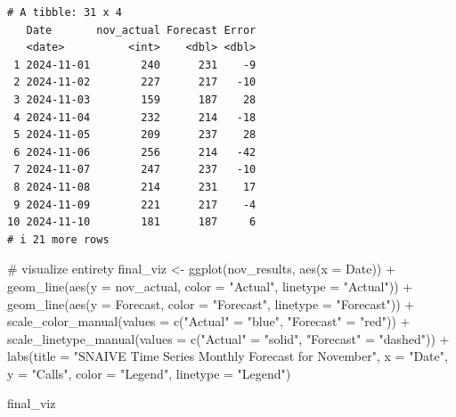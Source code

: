 \documentclass[
  letterpaper,
  DIV=11,
  numbers=noendperiod]{scrartcl}
\newenvironment{Shaded}{\begin{snugshade}}{\end{snugshade}}
\newcommand{\AttributeTok}[1]{\textcolor[rgb]{0.40,0.45,0.13}{#1}}
\newcommand{\CommentTok}[1]{\textcolor[rgb]{0.37,0.37,0.37}{#1}}
\newcommand{\FunctionTok}[1]{\textcolor[rgb]{0.28,0.35,0.67}{#1}}
\newcommand{\NormalTok}[1]{\textcolor[rgb]{0.00,0.23,0.31}{#1}}
\newcommand{\OtherTok}[1]{\textcolor[rgb]{0.00,0.23,0.31}{#1}}
\newcommand{\SpecialCharTok}[1]{\textcolor[rgb]{0.37,0.37,0.37}{#1}}
\newcommand{\StringTok}[1]{\textcolor[rgb]{0.13,0.47,0.30}{#1}}
\begin{document}
\begin{verbatim}
# A tibble: 31 x 4
   Date       nov_actual Forecast Error
   <date>          <int>    <dbl> <dbl>
 1 2024-11-01        240      231    -9
 2 2024-11-02        227      217   -10
 3 2024-11-03        159      187    28
 4 2024-11-04        232      214   -18
 5 2024-11-05        209      237    28
 6 2024-11-06        256      214   -42
 7 2024-11-07        247      237   -10
 8 2024-11-08        214      231    17
 9 2024-11-09        221      217    -4
10 2024-11-10        181      187     6
# i 21 more rows
\end{verbatim}

\begin{Shaded}
\begin{Highlighting}[]
\CommentTok{\# visualize entirety}
\NormalTok{final\_viz }\OtherTok{\textless{}{-}} \FunctionTok{ggplot}\NormalTok{(nov\_results, }\FunctionTok{aes}\NormalTok{(}\AttributeTok{x =}\NormalTok{ Date)) }\SpecialCharTok{+}
  \FunctionTok{geom\_line}\NormalTok{(}\FunctionTok{aes}\NormalTok{(}\AttributeTok{y =}\NormalTok{ nov\_actual, }\AttributeTok{color =} \StringTok{"Actual"}\NormalTok{, }\AttributeTok{linetype =} \StringTok{"Actual"}\NormalTok{)) }\SpecialCharTok{+}
  \FunctionTok{geom\_line}\NormalTok{(}\FunctionTok{aes}\NormalTok{(}\AttributeTok{y =}\NormalTok{ Forecast, }\AttributeTok{color =} \StringTok{"Forecast"}\NormalTok{, }\AttributeTok{linetype =} \StringTok{"Forecast"}\NormalTok{)) }\SpecialCharTok{+}
  \FunctionTok{scale\_color\_manual}\NormalTok{(}\AttributeTok{values =} \FunctionTok{c}\NormalTok{(}\StringTok{"Actual"} \OtherTok{=} \StringTok{"blue"}\NormalTok{, }\StringTok{"Forecast"} \OtherTok{=} \StringTok{"red"}\NormalTok{)) }\SpecialCharTok{+}
  \FunctionTok{scale\_linetype\_manual}\NormalTok{(}\AttributeTok{values =} \FunctionTok{c}\NormalTok{(}\StringTok{"Actual"} \OtherTok{=} \StringTok{"solid"}\NormalTok{, }\StringTok{"Forecast"} \OtherTok{=} \StringTok{"dashed"}\NormalTok{)) }\SpecialCharTok{+}
  \FunctionTok{labs}\NormalTok{(}\AttributeTok{title =} \StringTok{"SNAIVE Time Series Monthly Forecast for November"}\NormalTok{,}
       \AttributeTok{x =} \StringTok{"Date"}\NormalTok{,}
       \AttributeTok{y =} \StringTok{"Calls"}\NormalTok{,}
       \AttributeTok{color =} \StringTok{"Legend"}\NormalTok{,}
       \AttributeTok{linetype =} \StringTok{"Legend"}\NormalTok{)}

\NormalTok{final\_viz}
\end{Highlighting}
\end{Shaded}
\end{document}
